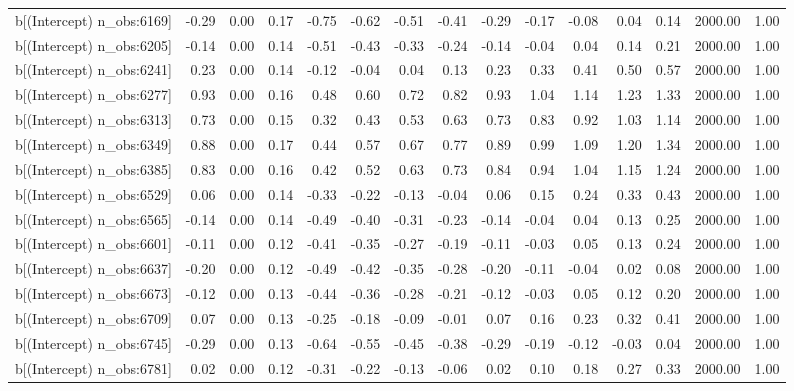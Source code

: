 \begin{table}[ht]
\begin{tabular}{rrrrrrrrrrrrrrr}
  b[(Intercept) n\_obs:6169] & -0.29 & 0.00 & 0.17 & -0.75 & -0.62 & -0.51 & -0.41 & -0.29 & -0.17 & -0.08 & 0.04 & 0.14 & 2000.00 & 1.00 \\ 
  b[(Intercept) n\_obs:6205] & -0.14 & 0.00 & 0.14 & -0.51 & -0.43 & -0.33 & -0.24 & -0.14 & -0.04 & 0.04 & 0.14 & 0.21 & 2000.00 & 1.00 \\ 
  b[(Intercept) n\_obs:6241] & 0.23 & 0.00 & 0.14 & -0.12 & -0.04 & 0.04 & 0.13 & 0.23 & 0.33 & 0.41 & 0.50 & 0.57 & 2000.00 & 1.00 \\ 
  b[(Intercept) n\_obs:6277] & 0.93 & 0.00 & 0.16 & 0.48 & 0.60 & 0.72 & 0.82 & 0.93 & 1.04 & 1.14 & 1.23 & 1.33 & 2000.00 & 1.00 \\ 
  b[(Intercept) n\_obs:6313] & 0.73 & 0.00 & 0.15 & 0.32 & 0.43 & 0.53 & 0.63 & 0.73 & 0.83 & 0.92 & 1.03 & 1.14 & 2000.00 & 1.00 \\ 
  b[(Intercept) n\_obs:6349] & 0.88 & 0.00 & 0.17 & 0.44 & 0.57 & 0.67 & 0.77 & 0.89 & 0.99 & 1.09 & 1.20 & 1.34 & 2000.00 & 1.00 \\ 
  b[(Intercept) n\_obs:6385] & 0.83 & 0.00 & 0.16 & 0.42 & 0.52 & 0.63 & 0.73 & 0.84 & 0.94 & 1.04 & 1.15 & 1.24 & 2000.00 & 1.00 \\ 
  b[(Intercept) n\_obs:6529] & 0.06 & 0.00 & 0.14 & -0.33 & -0.22 & -0.13 & -0.04 & 0.06 & 0.15 & 0.24 & 0.33 & 0.43 & 2000.00 & 1.00 \\ 
  b[(Intercept) n\_obs:6565] & -0.14 & 0.00 & 0.14 & -0.49 & -0.40 & -0.31 & -0.23 & -0.14 & -0.04 & 0.04 & 0.13 & 0.25 & 2000.00 & 1.00 \\ 
  b[(Intercept) n\_obs:6601] & -0.11 & 0.00 & 0.12 & -0.41 & -0.35 & -0.27 & -0.19 & -0.11 & -0.03 & 0.05 & 0.13 & 0.24 & 2000.00 & 1.00 \\ 
  b[(Intercept) n\_obs:6637] & -0.20 & 0.00 & 0.12 & -0.49 & -0.42 & -0.35 & -0.28 & -0.20 & -0.11 & -0.04 & 0.02 & 0.08 & 2000.00 & 1.00 \\ 
  b[(Intercept) n\_obs:6673] & -0.12 & 0.00 & 0.13 & -0.44 & -0.36 & -0.28 & -0.21 & -0.12 & -0.03 & 0.05 & 0.12 & 0.20 & 2000.00 & 1.00 \\ 
  b[(Intercept) n\_obs:6709] & 0.07 & 0.00 & 0.13 & -0.25 & -0.18 & -0.09 & -0.01 & 0.07 & 0.16 & 0.23 & 0.32 & 0.41 & 2000.00 & 1.00 \\ 
  b[(Intercept) n\_obs:6745] & -0.29 & 0.00 & 0.13 & -0.64 & -0.55 & -0.45 & -0.38 & -0.29 & -0.19 & -0.12 & -0.03 & 0.04 & 2000.00 & 1.00 \\ 
  b[(Intercept) n\_obs:6781] & 0.02 & 0.00 & 0.12 & -0.31 & -0.22 & -0.13 & -0.06 & 0.02 & 0.10 & 0.18 & 0.27 & 0.33 & 2000.00 & 1.00 \\ 

\end{tabular}
\end{table}
